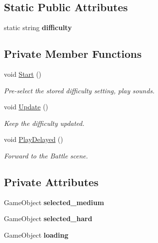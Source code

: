 \subsection*{Static Public Attributes}
\begin{DoxyCompactItemize}
\item 
\mbox{\label{class_bot_screen_a290ac499ce563b31c96862a68d02f562}} 
static string {\bfseries difficulty}
\end{DoxyCompactItemize}
\subsection*{Private Member Functions}
\begin{DoxyCompactItemize}
\item 
\mbox{\label{class_bot_screen_a3ffff8c4a3c08bfc13dde5e3a7af702f}} 
void \mbox{\hyperlink{class_bot_screen_a3ffff8c4a3c08bfc13dde5e3a7af702f}{Start}} ()
\begin{DoxyCompactList}\small\item\em Pre-\/select the stored difficulty setting, play sounds. \end{DoxyCompactList}\item 
\mbox{\label{class_bot_screen_a4a3fe27c63d7539549cd01b2f7176ed5}} 
void \mbox{\hyperlink{class_bot_screen_a4a3fe27c63d7539549cd01b2f7176ed5}{Update}} ()
\begin{DoxyCompactList}\small\item\em Keep the difficulty updated. \end{DoxyCompactList}\item 
\mbox{\label{class_bot_screen_a4d2d8d3ba5b06b185ee0ee039dbdcdd4}} 
void \mbox{\hyperlink{class_bot_screen_a4d2d8d3ba5b06b185ee0ee039dbdcdd4}{Play\+Delayed}} ()
\begin{DoxyCompactList}\small\item\em Forward to the Battle scene. \end{DoxyCompactList}\end{DoxyCompactItemize}
\subsection*{Private Attributes}
\begin{DoxyCompactItemize}
\item 
\mbox{\label{class_bot_screen_af79faac4fee58c76b8630e8c04194b1e}} 
Game\+Object {\bfseries selected\+\_\+medium}
\item 
\mbox{\label{class_bot_screen_a262f5baad010eaff48025e5121de8399}} 
Game\+Object {\bfseries selected\+\_\+hard}
\item 
\mbox{\label{class_bot_screen_a233b5c70a27ea041ec3485282b95dedf}} 
Game\+Object {\bfseries loading}
\end{DoxyCompactItemize}


